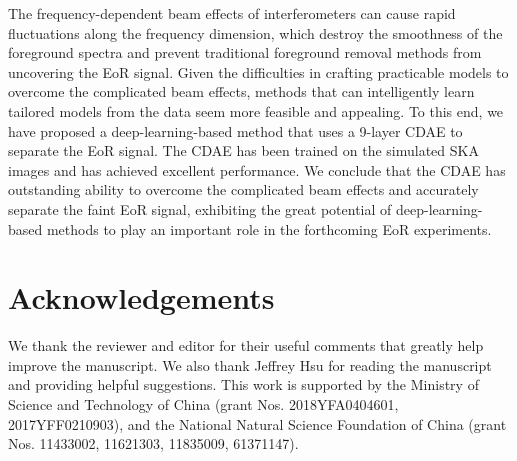 \documentclass[fleqn,usenatbib]{mnras}
\begin{document}
The frequency-dependent beam effects of interferometers can cause
rapid fluctuations along the frequency dimension,
which destroy the smoothness of the foreground spectra and prevent
traditional foreground removal methods from uncovering the EoR signal.
Given the difficulties in crafting practicable models to overcome the
complicated beam effects, methods that can intelligently learn tailored
models from the data seem more feasible and appealing.
To this end, we have proposed a deep-learning-based method that uses
a 9-layer CDAE to separate the EoR signal.
The CDAE has been trained on the simulated SKA images and has achieved
excellent performance.
We conclude that the CDAE has outstanding ability to overcome the
complicated beam effects and accurately separate the faint EoR signal,
exhibiting the great potential of deep-learning-based methods
to play an important role in the forthcoming EoR experiments.


\section*{Acknowledgements}

We thank the reviewer and editor for their useful comments that greatly
help improve the manuscript.
We also thank Jeffrey Hsu for reading the manuscript and providing
helpful suggestions.
This work is supported by
the Ministry of Science and Technology of China
(grant Nos. 2018YFA0404601, 2017YFF0210903),
and the National Natural Science Foundation of China
(grant Nos. 11433002, 11621303, 11835009, 61371147).










\bsp	%
\label{lastpage}
\end{document}
